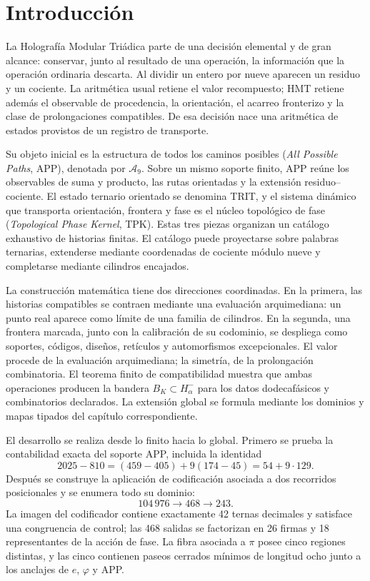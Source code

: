 \chapter*{Introducción}

La Holografía Modular Triádica parte de una decisión elemental y de gran
alcance: conservar, junto al resultado de una operación, la información que
la operación ordinaria descarta. Al dividir un entero por nueve aparecen un
residuo y un cociente. La aritmética usual retiene el valor recompuesto;
HMT retiene además el observable de procedencia, la orientación, el acarreo
fronterizo y la clase de prolongaciones compatibles. De esa decisión nace una
aritmética de estados provistos de un registro de transporte.

Su objeto inicial es la estructura de todos los caminos posibles
(\emph{All Possible Paths}, APP), denotada por \(\mathcal A_9\). Sobre un
mismo soporte finito, APP reúne los observables de suma y producto, las rutas
orientadas y la extensión residuo--cociente. El estado ternario orientado se
denomina TRIT, y el sistema dinámico que transporta orientación, frontera y
fase es el núcleo topológico de fase (\emph{Topological Phase Kernel}, TPK).
Estas tres piezas organizan un catálogo exhaustivo de historias finitas. El
catálogo puede proyectarse sobre palabras ternarias, extenderse mediante
coordenadas de cociente módulo nueve y completarse mediante cilindros encajados.

La construcción matemática tiene dos direcciones coordinadas. En la
primera, las historias compatibles se contraen mediante una evaluación
arquimediana: un punto real aparece como límite de una familia de cilindros.
En la segunda, una frontera marcada, junto con la calibración de su codominio,
se despliega como soportes, códigos, diseños, retículos y automorfismos
excepcionales. El valor procede de la evaluación arquimediana; la simetría,
de la prolongación combinatoria. El teorema finito de compatibilidad muestra
que ambas operaciones producen la bandera \(B_K\subset H^-_\alpha\) para los
datos dodecafásicos y combinatorios declarados. La extensión global se
formula mediante los dominios y mapas tipados del capítulo correspondiente.

El desarrollo se realiza desde lo finito hacia lo global. Primero se prueba
la contabilidad exacta del soporte APP, incluida la identidad
\[
2025-810=(459-405)+9(174-45)=54+9\cdot129.
\]
Después se construye la aplicación de codificación asociada a dos recorridos
posicionales y se enumera todo su dominio:
\[
104\,976\longrightarrow468\longrightarrow243.
\]
La imagen del codificador contiene exactamente 42 ternas decimales y satisface
una congruencia de control; las 468 salidas se factorizan en 26 firmas y 18 representantes de
la acción de fase. La fibra asociada a \(\pi\) posee cinco regiones
distintas, y las cinco contienen paseos cerrados mínimos de
longitud ocho junto a los anclajes de \(e\), \(\varphi\) y APP.

